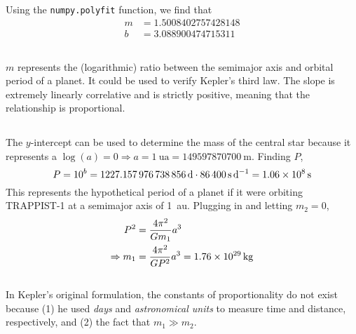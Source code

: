 \documentclass{article}
\begin{document}
\subsection{}


Using the \lstinline|numpy.polyfit| function, we find that
\begin{align}
    m &= \num{1.5008402757428148} \\
    b &= \num{3.088900474715311}
\end{align}

\subsection{}

\(m\) represents the (logarithmic) ratio between the semimajor axis and orbital period of a planet.
It could be used to verify Kepler's third law.
The slope is extremely linearly correlative and is strictly positive, meaning that the relationship is proportional.

\subsection{}

The \(y\)-intercept can be used to determine the mass of the central star because it represents a \(\log(a) = 0 \Rightarrow a = \SI{1}{\astronomicalunit} = \SI{149597870700}{\meter}\).
Finding \(P\),
\begin{equation}
    P = 10^b = \SI{1227.157976738856}{\day} \cdot \SI{86400}{\second\per\day} = \SI{1.06d8}{\second}
\end{equation}
This represents the hypothetical period of a planet if it were orbiting TRAPPIST-1 at a semimajor axis of \SI{1}{\astronomicalunit}.
Plugging in and letting \(m_2 = 0\),
\begin{align}
    P^2 &= \frac{4 \pi^2}{G m_1}a^3 \\
    \Rightarrow m_1 &= \frac{4 \pi^2}{G P^2}a^3 = \SI{1.76d29}{\kilogram}
\end{align}

\subsection{}

In Kepler's original formulation, the constants of proportionality do not exist because (1) he used \emph{days} and \emph{astronomical units} to measure time and distance, respectively, and (2) the fact that \(m_1 \gg m_2\).
\end{document}

